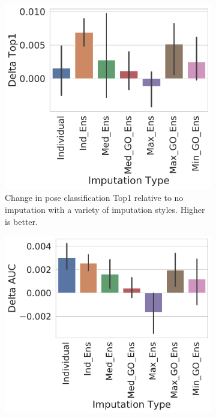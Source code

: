 \documentclass[journal=jcim,manuscript=article]{achemso}
\begin{document}
\begin{figure}[tbph]
    \begin{subfigure}[t]{0.48\textwidth}
        \centering
        \includegraphics[width=\linewidth]{figures/ComparingImpStylesTop1.pdf}
        \caption{Change in pose classification Top1 relative to no imputation with a variety of imputation styles. Higher is better.}
    \end{subfigure}
    \hfill
    \begin{subfigure}[t]{0.48\textwidth}
        \centering
        \includegraphics[width=\linewidth]{figures/ComparingImpStylesAUC.pdf}

\end{subfigure}
\end{figure}
\end{document}
